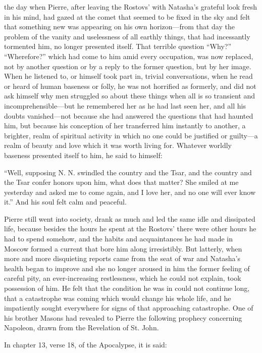  the day when Pierre, after leaving the Rostovs' with
Natasha's grateful look fresh in his mind, had gazed at the comet
that seemed to be fixed in the sky and felt that something new
was appearing on his own horizon---from that day the problem of
the vanity and uselessness of all earthly things, that had
incessantly tormented him, no longer presented itself. That
terrible question ``Why?'' ``Wherefore?'' which had come to him
amid every occupation, was now replaced, not by another question
or by a reply to the former question, but by her image. When he
listened to, or himself took part in, trivial conversations, when
he read or heard of human baseness or folly, he was not horrified
as formerly, and did not ask himself why men struggled so about
these things when all is so transient and incomprehensible---but
he remembered her as he had last seen her, and all his doubts
vanished---not because she had answered the questions that had
haunted him, but because his conception of her transferred him
instantly to another, a brighter, realm of spiritual activity in
which no one could be justified or guilty---a realm of beauty and
love which it was worth living for. Whatever worldly baseness
presented itself to him, he said to himself:

``Well, supposing N. N. swindled the country and the Tsar, and
the country and the Tsar confer honors upon him, what does that
matter? She smiled at me yesterday and asked me to come again,
and I love her, and no one will ever know it.'' And his soul felt
calm and peaceful.

Pierre still went into society, drank as much and led the same
idle and dissipated life, because besides the hours he spent at
the Rostovs' there were other hours he had to spend somehow, and
the habits and acquaintances he had made in Moscow formed a
current that bore him along irresistibly. But latterly, when more
and more disquieting reports came from the seat of war and
Natasha's health began to improve and she no longer aroused in
him the former feeling of careful pity, an ever-increasing
restlessness, which he could not explain, took possession of
him. He felt that the condition he was in could not continue
long, that a catastrophe was coming which would change his whole
life, and he impatiently sought everywhere for signs of that
approaching catastrophe.  One of his brother Masons had revealed
to Pierre the following prophecy concerning Napoleon, drawn from
the Revelation of St. John.

In chapter 13, verse 18, of the Apocalypse, it is said:

